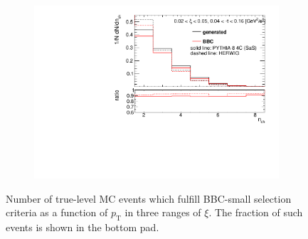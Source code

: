 \begin{figure}[h!]
\begin{subfigure}{.45\textwidth}
		\includegraphics[width=\textwidth,page=7]{chapters/chrgSTAR/img/bbcCorrection/xi_bbc.pdf}
	\end{subfigure}
	\begin{minipage}{.45\textwidth}
		\caption{Number of true-level MC events which fulfill BBC-small selection criteria  as a function of $p_\textrm{T}$ in three ranges of $\xi$. The fraction of such events is shown in the bottom pad.}
		\label{fig:bbcCorection_pt}
	\end{minipage}
\end{figure}

